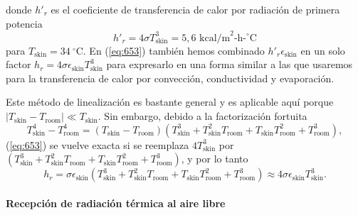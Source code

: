 \documentclass[12pt]{book}
\begin{document}
donde $h'_r$ es el coeficiente de transferencia de calor por radiación de primera potencia
\begin{equation}
h'_r = 4\sigma T_{\text{skin}}^3 = 5{,}6\text{ kcal/m}^2\text{-h-}^\circ\text{C}
\label{eq:654}
\end{equation}
para $T_{\text{skin}} = 34\ ^\circ\text{C}$. En (\ref{eq:653}) también hemos combinado $h'_r \epsilon_{\text{skin}}$ en un solo factor $h_r = 4\sigma \epsilon_{\text{skin}} T_{\text{skin}}^3$ para expresarlo en una forma similar a las que usaremos para la transferencia de calor por convección, conductividad y evaporación.

Este método de linealización es bastante general y es aplicable aquí porque $|T_{\text{skin}} - T_{\text{room}}| \ll T_{\text{skin}}$. Sin embargo, debido a la factorización fortuita
\begin{equation}
T_{\text{skin}}^4 - T_{\text{room}}^4 = (T_{\text{skin}} - T_{\text{room}})(T_{\text{skin}}^3 + T_{\text{skin}}^2 T_{\text{room}} + T_{\text{skin}} T_{\text{room}}^2 + T_{\text{room}}^3),
\label{eq:655}
\end{equation}
(\ref{eq:653}) se vuelve exacta si se reemplaza $4 T_{\text{skin}}^3$ por $(T_{\text{skin}}^3 + T_{\text{skin}}^2 T_{\text{room}} + T_{\text{skin}} T_{\text{room}}^2 + T_{\text{room}}^3)$, y por lo tanto
\begin{equation}
h_r = \sigma \epsilon_{\text{skin}} (T_{\text{skin}}^3 + T_{\text{skin}}^2 T_{\text{room}} + T_{\text{skin}} T_{\text{room}}^2 + T_{\text{room}}^3) \approx 4 \sigma \epsilon_{\text{skin}} T_{\text{skin}}^3.
\label{eq:656}
\end{equation}

\paragraph*{Recepción de radiación térmica al aire libre}
\end{document}
